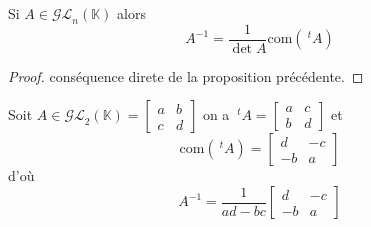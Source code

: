 \documentclass[11pt,colorlinks]{book}
\theoremstyle{mytheoremstyle}
\theoremstyle{mytheoremstyle}
\theoremstyle{mytheoremstyle}
\theoremstyle{mytheoremstyle}
\theoremstyle{mytheoremstyle}
\theoremstyle{mytheoremstyle}
\theoremstyle{mytheoremstyle}
\theoremstyle{mytheoremstyle}
\theoremstyle{myproblemstyle}
\def\mbb#1{\mathbb{#1}}
\def\bK{\mbb{K}}
\begin{document}
\begin{theorem}
  Si $A \in \mathcal{GL}_n(\bK)$ alors 
  \begin{equation*}
    A^{-1} = \frac{1}{\det A} \text{com}(~^tA)
  \end{equation*}
  \begin{proof}
    conséquence direte de la proposition précédente.
  \end{proof}
\end{theorem}
\begin{rmq}
  Soit $A \in \mathcal{GL}_2(\bK) = \begin{bmatrix}
    a & b \\ 
    c & d
  \end{bmatrix}$
  on a $~^tA = \begin{bmatrix}
    a & c \\ 
    b & d
  \end{bmatrix}$
  et 
  \begin{equation*}
    \text{com}(~^tA) = \begin{bmatrix}
      d & -c \\ 
      -b & a
    \end{bmatrix}
  \end{equation*}
  d'où 
  \begin{equation*}
    A^{-1} = \frac{1}{ad-bc} \begin{bmatrix}
      d & -c \\ 
      -b & a
    \end{bmatrix}
  \end{equation*}
\end{rmq}
\end{document}
